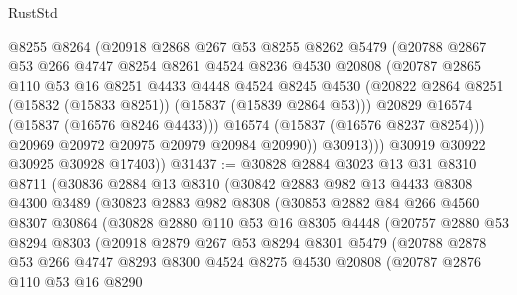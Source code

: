 \begin{lexlean}{RustStd}
\begin{coremodule}
                @8255
                @8264
                (@20918
                  @2868
                  @267
                  @53
                  @8255
                  @8262
                  @5479
                  (@20788
                    @2867
                    @53
                    @266
                    @4747
                    @8254
                    @8261
                    @4524
                    @8236
                    @4530
                    @20808
                    (@20787
                      @2865
                      @110
                      @53
                      @16
                      @8251
                      @4433
                      @4448
                      @4524
                      @8245
                      @4530
                      (@20822 @2864 @8251 (@15832 (@15833 @8251)) (@15837 (@15839 @2864 @53)))
                      @20829
                      @16574
                      (@15837 (@16576 @8246 @4433)))
                    @16574
                    (@15837 (@16576 @8237 @8254)))
                  @20969
                  @20972
                  @20975
                  @20979
                  @20984
                  @20990))
              @30913)))
        @30919
        @30922
        @30925
        @30928
        @17403))
@31437 := @30828
    @2884
    @3023
    @13
    @31
    @8310
    @8711
    (@30836
      @2884
      @13
      @8310
      (@30842
        @2883
        @982
        @13
        @4433
        @8308
        @4300
        @3489
        (@30823
          @2883
          @982
          @8308
          (@30853
            @2882
            @84
            @266
            @4560
            @8307
            @30864
            (@30828
              @2880
              @110
              @53
              @16
              @8305
              @4448
              (@20757
                @2880
                @53
                @8294
                @8303
                (@20918
                  @2879
                  @267
                  @53
                  @8294
                  @8301
                  @5479
                  (@20788
                    @2878
                    @53
                    @266
                    @4747
                    @8293
                    @8300
                    @4524
                    @8275
                    @4530
                    @20808
                    (@20787
                      @2876
                      @110
                      @53
                      @16
                      @8290

\end{coremodule}
\end{lexlean}
